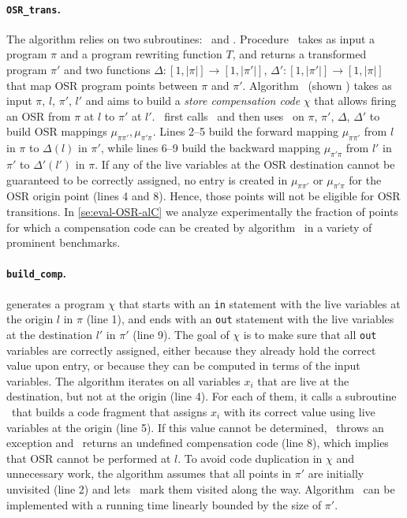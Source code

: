 \paragraph*{\texttt{OSR\_trans}.} The algorithm relies on two subroutines: \apply\ and \buildcomp. Procedure \apply\ takes as input a program $\pi$ and a program rewriting function $T$, and returns a transformed program $\pi'$ and two functions $\Delta:[1,|\pi|]\rightarrow [1,|\pi'|]$, $\Delta':[1,|\pi'|]\rightarrow [1,|\pi|]$ that map OSR program points between $\pi$ and $\pi'$. 
Algorithm \buildcomp\ (shown ) takes as input $\pi$, $l$, $\pi'$, $l'$ and aims to build a {\em store compensation code} $\chi$ that allows firing an OSR from $\pi$ at $l$ to $\pi'$ at $l'$. \osrtrans\ first calls \apply\ and then uses \buildcomp\ on $\pi$, $\pi'$, $\Delta$, $\Delta'$ to build OSR mappings $\mu_{\pi\pi'},\mu_{\pi'\pi}$. Lines 2--5 build the forward mapping $\mu_{\pi\pi'}$ from $l$ in $\pi$ to $\Delta(l)$ in $\pi'$, while lines 6--9 build the backward mapping $\mu_{\pi'\pi}$ from $l'$ in $\pi'$ to $\Delta'(l')$ in $\pi$. If any of the live variables at the OSR destination cannot be guaranteed to be correctly assigned, no entry is created in $\mu_{\pi\pi'}$ or $\mu_{\pi'\pi}$ for the OSR origin point (lines 4 and 8). Hence, those points will not be eligible for OSR transitions. In \mysection\ref{se:eval-OSR-alC} we analyze experimentally the fraction of points for which a compensation code can be created by algorithm \buildcomp\ in a variety of prominent benchmarks.

\paragraph*{\texttt{build\_comp}.}  generates a program $\chi$ that starts with an {\tt in} statement with the live variables at the origin $l$ in $\pi$ (line 1), and ends with an {\tt out} statement with the live variables at the destination $l'$ in $\pi'$ (line 9). The goal of $\chi$ is to make sure that all {\tt out} variables are correctly assigned, either because they already hold the correct value upon entry, or because they can be computed in terms of the input variables. The algorithm iterates on all variables $x_i$ that are live at the destination, but not at the origin (line 4). For each of them, it calls a subroutine \reconstruct\ that builds a code fragment that assigns $x_i$ with its correct value using live variables at the origin (line 5). If this value cannot be determined, \reconstruct\ throws an exception and \buildcomp\ returns an undefined compensation code (line 8), which implies that OSR cannot be performed at $l$. To avoid code duplication in $\chi$ and unnecessary work, the algorithm assumes that all points in $\pi'$ are initially unvisited (line 2) and lets \reconstruct\ mark them visited along the way. Algorithm \buildcomp\ can be implemented with a running time linearly bounded by the size of $\pi'$.

